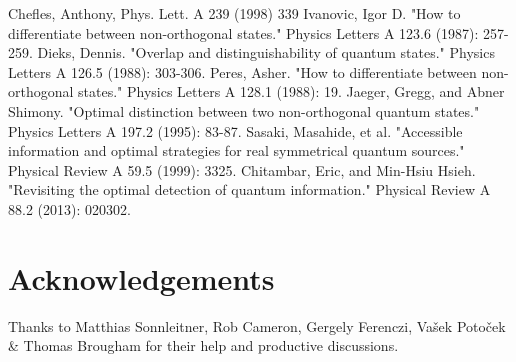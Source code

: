 \documentclass[a0,portrait]{a0poster}
\begin{document}
\begin{multicols}{2}
\begin{thebibliography}{9}
	 Chefles, Anthony, Phys. Lett. A 239 (1998) 339
	 Ivanovic, Igor D. "How to differentiate between non-orthogonal states." Physics Letters A 123.6 (1987): 257-259.
	 Dieks, Dennis. "Overlap and distinguishability of quantum states." Physics Letters A 126.5 (1988): 303-306.
	 Peres, Asher. "How to differentiate between non-orthogonal states." Physics Letters A 128.1 (1988): 19.
	 Jaeger, Gregg, and Abner Shimony. "Optimal distinction between two non-orthogonal quantum states." Physics Letters A 197.2 (1995): 83-87.
	 Sasaki, Masahide, et al. "Accessible information and optimal strategies for real symmetrical quantum sources." Physical Review A 59.5 (1999): 3325.
	 Chitambar, Eric, and Min-Hsiu Hsieh. "Revisiting the optimal detection of quantum information." Physical Review A 88.2 (2013): 020302.
\end{thebibliography}

\section*{Acknowledgements}

Thanks to Matthias Sonnleitner, Rob Cameron, Gergely Ferenczi, Va\v{s}ek Poto\v{c}ek \& Thomas Brougham for their help and productive discussions.


\end{multicols}
\end{document}
